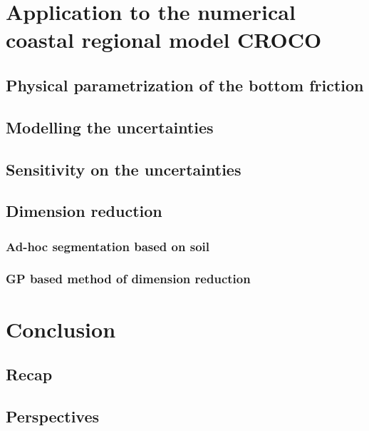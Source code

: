 \documentclass[11pt]{article}
\begin{document}
\section{Application to the numerical coastal regional model CROCO}
\label{sec:org813659a}
\subsection{Physical parametrization of the bottom friction}
\label{sec:org9b187aa}
\subsection{Modelling the uncertainties}
\label{sec:orge22b8e5}
\subsection{Sensitivity on the uncertainties}
\label{sec:orgdf82b55}
\subsection{Dimension reduction}
\label{sec:org2b3d8f6}
\subsubsection{Ad-hoc segmentation based on soil}
\label{sec:orgb2a1a3f}
\subsubsection{GP based method of dimension reduction}
\label{sec:org6536119}

\section{Conclusion}
\label{sec:org0d37aca}
\subsection{Recap}
\label{sec:orgdb61c4b}
\subsection{Perspectives}
\label{sec:org500c0a8}
\end{document}
